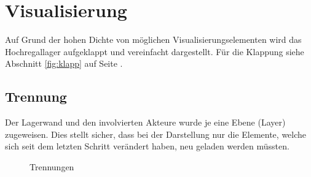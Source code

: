 \newpage
\section{Visualisierung}
Auf Grund der hohen Dichte von möglichen Visualisierungselementen wird das Hochregallager aufgeklappt und vereinfacht dargestellt. Für die Klappung siehe Abschnitt \ref{fig:klapp} auf Seite \pageref{fig:klapp}.
%
\subsection{Trennung}
Der Lagerwand und den involvierten Akteure wurde je eine Ebene (Layer) zugeweisen. Dies stellt sicher, dass bei der Darstellung nur die Elemente, welche sich seit dem letzten Schritt verändert haben, neu geladen werden müssten.
%
\begin{figure}[h]
\hfill
{}\hfill
{}
\caption{Trennungen}
\end{figure}
%
